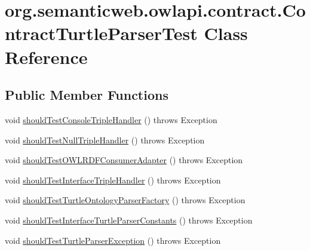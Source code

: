 \hypertarget{classorg_1_1semanticweb_1_1owlapi_1_1contract_1_1_contract_turtle_parser_test}{\section{org.\-semanticweb.\-owlapi.\-contract.\-Contract\-Turtle\-Parser\-Test Class Reference}
\label{classorg_1_1semanticweb_1_1owlapi_1_1contract_1_1_contract_turtle_parser_test}
}
\subsection*{Public Member Functions}
\begin{DoxyCompactItemize}
\item 
void \hyperlink{classorg_1_1semanticweb_1_1owlapi_1_1contract_1_1_contract_turtle_parser_test_aca2e0d09d01524e6eded3bbc0b67dee6}{should\-Test\-Console\-Triple\-Handler} ()  throws Exception 
\item 
void \hyperlink{classorg_1_1semanticweb_1_1owlapi_1_1contract_1_1_contract_turtle_parser_test_a5b5c70ba2c85469ac68e71e2f53725be}{should\-Test\-Null\-Triple\-Handler} ()  throws Exception 
\item 
void \hyperlink{classorg_1_1semanticweb_1_1owlapi_1_1contract_1_1_contract_turtle_parser_test_a7c592ba09c343a7560d7bd307712b705}{should\-Test\-O\-W\-L\-R\-D\-F\-Consumer\-Adapter} ()  throws Exception 
\item 
void \hyperlink{classorg_1_1semanticweb_1_1owlapi_1_1contract_1_1_contract_turtle_parser_test_a60a6685259d054b9566018edee685c16}{should\-Test\-Interface\-Triple\-Handler} ()  throws Exception 
\item 
void \hyperlink{classorg_1_1semanticweb_1_1owlapi_1_1contract_1_1_contract_turtle_parser_test_ac2f3f29d2524a79841200f67a9a9394e}{should\-Test\-Turtle\-Ontology\-Parser\-Factory} ()  throws Exception 
\item 
void \hyperlink{classorg_1_1semanticweb_1_1owlapi_1_1contract_1_1_contract_turtle_parser_test_ab0c005e499a175f1e87cb18e590eb132}{should\-Test\-Interface\-Turtle\-Parser\-Constants} ()  throws Exception 
\item 
void \hyperlink{classorg_1_1semanticweb_1_1owlapi_1_1contract_1_1_contract_turtle_parser_test_a00cc0868360d3fb89748c58675dabfa2}{should\-Test\-Turtle\-Parser\-Exception} ()  throws Exception 
\end{DoxyCompactItemize}


